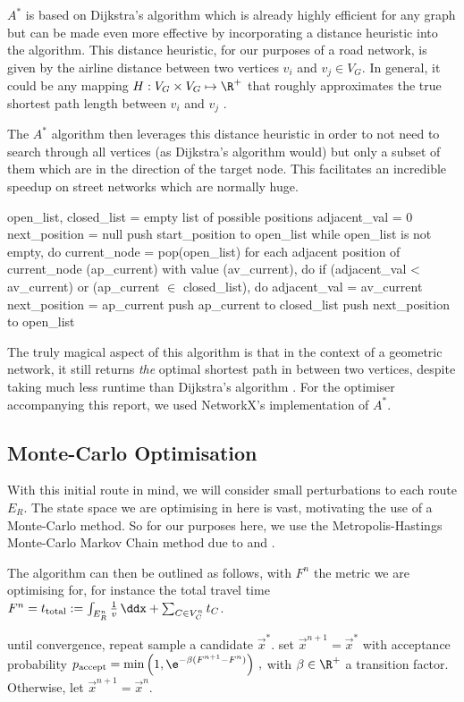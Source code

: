 \documentclass{prettytex/ox/mmsc-special-topic}
\begin{document}
  $A^*$ is based on Dijkstra's algorithm which is already highly efficient for any graph but can be made even more effective by incorporating a distance heuristic into the algorithm.
  This distance heuristic, for our purposes of a road network, is given by the airline distance between two vertices $v_i$ and $v_j \in V_G$.
  In general, it could be any mapping $H: V_G \times V_G \mapsto \R^+$ that roughly approximates the true shortest path length between $v_i$ and $v_j$ \parencite{astar}.

  The $A^*$ algorithm then leverages this distance heuristic in order to not need to search through all vertices (as Dijkstra's algorithm would) but only a subset of them which are in the direction of the target node.
  This facilitates an incredible speedup on street networks which are normally huge.

  \begin{algorithm}[language=pseudo,basicstyle=\footnotesize,caption={\centering The $A^*$-search algorithm \parencite{astar}}]
open_list, closed_list = empty list of possible positions
adjacent_val = 0
next_position = null
push start_position to open_list
while open_list is not empty, do
  current_node = pop(open_list)
  for each adjacent position of current_node (ap_current)
        with value (av_current), do
    if (adjacent_val < av_current) or (ap_current $\in$ closed_list), do
      adjacent_val = av_current
      next_position = ap_current
    push ap_current to closed_list
  push next_position to open_list
  \end{algorithm}

  The truly magical aspect of this algorithm is that in the context of a geometric network, it still returns \textit{the} optimal shortest path in between two vertices, despite taking much less runtime than Dijkstra's algorithm \parencite{astar}.
  For the optimiser accompanying this report, we used NetworkX's implementation of $A^*$.

  \subsection{Monte-Carlo Optimisation}
  With this initial route in mind, we will consider small perturbations to each route $E_R$.
  The state space we are optimising in here is vast, motivating the use of a Monte-Carlo method.
  So for our purposes here, we use the Metropolis-Hastings Monte-Carlo Markov Chain method due to \cite{metropolis} and \cite{hastings}.

  The algorithm can then be outlined as follows, with $F^{n}$ the metric we are optimising for, for instance the total travel time $F^n = t_{\rm total} := \int_{E_R^n} \frac{1}{v} \,\ddx + \sum_{C \in V_C^n} t_C$.
  \begin{algorithm}[language=pseudo,caption={\centering The Metropolis-Hastings algorithm \parencite{metropolis, hastings}},basicstyle=\footnotesize]
until convergence, repeat
  sample a candidate $\vec{x}^*$.
  set $\vec{x}^{n+1} = \vec{x}^*$ with acceptance probability
    $p_{\rm accept} = \min\left(1, \e^{-\beta (F^{n+1} - F^n)}\right)\,,$ with $\beta \in \R^+$ a transition factor.
  Otherwise, let $\vec{x}^{n+1} = \vec{x}^{n}$.
  \end{algorithm}
\end{document}
